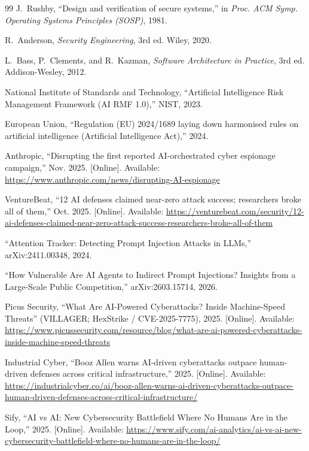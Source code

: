 \documentclass[conference]{IEEEtran}
\begin{document}
\begin{thebibliography}{99}
J.~Rushby, ``Design and verification of secure systems,'' in \emph{Proc.
ACM Symp. Operating Systems Principles (SOSP)}, 1981.

R.~Anderson, \emph{Security Engineering}, 3rd ed. Wiley, 2020.

L.~Bass, P.~Clements, and R.~Kazman, \emph{Software Architecture in
Practice}, 3rd ed. Addison-Wesley, 2012.

National Institute of Standards and Technology, ``Artificial Intelligence
Risk Management Framework (AI RMF 1.0),'' NIST, 2023.

European Union, ``Regulation (EU) 2024/1689 laying down harmonised rules
on artificial intelligence (Artificial Intelligence Act),'' 2024.

Anthropic, ``Disrupting the first reported AI-orchestrated cyber espionage
campaign,'' Nov. 2025. [Online]. Available:
\url{https://www.anthropic.com/news/disrupting-AI-espionage}

VentureBeat, ``12 AI defenses claimed near-zero attack success; researchers
broke all of them,'' Oct. 2025. [Online]. Available:
\url{https://venturebeat.com/security/12-ai-defenses-claimed-near-zero-attack-success-researchers-broke-all-of-them}

``Attention Tracker: Detecting Prompt Injection Attacks in LLMs,''
arXiv:2411.00348, 2024.

``How Vulnerable Are AI Agents to Indirect Prompt Injections? Insights from
a Large-Scale Public Competition,'' arXiv:2603.15714, 2026.

Picus Security, ``What Are AI-Powered Cyberattacks? Inside Machine-Speed
Threats'' (VILLAGER; HexStrike / CVE-2025-7775), 2025. [Online]. Available:
\url{https://www.picussecurity.com/resource/blog/what-are-ai-powered-cyberattacks-inside-machine-speed-threats}

Industrial Cyber, ``Booz Allen warns AI-driven cyberattacks outpace
human-driven defenses across critical infrastructure,'' 2025. [Online].
Available:
\url{https://industrialcyber.co/ai/booz-allen-warns-ai-driven-cyberattacks-outpace-human-driven-defenses-across-critical-infrastructure/}

Sify, ``AI vs AI: New Cybersecurity Battlefield Where No Humans Are in the
Loop,'' 2025. [Online]. Available:
\url{https://www.sify.com/ai-analytics/ai-vs-ai-new-cybersecurity-battlefield-where-no-humans-are-in-the-loop/}

\end{thebibliography}
\end{document}
